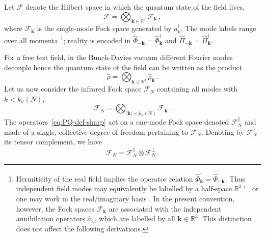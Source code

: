 \documentclass{article}
\numberwithin{equation}{section}
\begin{document}
		Let $\mathcal{F}$ denote the Hilbert space in which the quantum state of the field lives,
		\begin{equation}
			\mathcal{F}=\bigotimes_{\bm{k}\in \mathbb{R}^{3}}  \mathcal{F}_{\bm{k}}\, ,
		\end{equation}
		where $\mathcal{F}_{\bm{k}}$ is the single-mode Fock space generated by $\hat{a}_k^{\dagger}$. The mode labels range over all momenta
        \footnote{Hermiticity of the real field implies the operator relation $\hat\Phi_{\mathbf{k}}^{\dagger}=\hat\Phi_{-\mathbf{k}}$. Thus independent field modes may equivalently be labelled by a half-space $\mathbb{R}^{3+}$, or one may work in the real/imaginary basis \cite{Lesgourgues:1996jc,Kiefer:1998jk,Martin:2018zbe}. In the present convention, however, the Fock spaces $\mathcal F_{\mathbf k}$ are associated with the independent annihilation operators $\hat a_{\mathbf k}$, which are labelled by all $\mathbf k\in\mathbb R^3$. This distinction does not affect the following derivations.}; reality is encoded in $\hat{\Phi}_{-\bm{k}}=\hat{\Phi}_{\bm{k}}^\dagger$ and $\hat{\Pi}_{-\bm{k}}=\hat{\Pi}_{\bm{k}}^\dagger$.

        For a free test field, in the Bunch-Davies vacuum different Fourier modes decouple hence the quantum state of the field can be written as the product
		\begin{equation}
			\hat{\rho} = \bigotimes _{\bm{k}\in \mathbb{R}^{3}} \hat{\rho}_{\bm{k}}\, .
		\end{equation}
		Let us now consider the infrared Fock space \(\mathcal{F}_N\) containing all modes with \(k < k_\sigma(N)\),
		\begin{equation}
			\label{eq:FN:def}
			\mathcal{F}_N = \bigotimes_{|\bm{k}| < k_\sigma(N)} \mathcal{F}_{\bm{k}}\, .
		\end{equation}
		The operators~\eqref{eq:PQ-def-sharp} act on a one-mode Fock space denoted $\mathcal{F}_N^\parallel$ and made of a single, collective degree of freedom pertaining to $\mathcal{F}_N$. Denoting by $\mathcal{F}_N^\perp$ its tensor complement, we have
		\begin{equation}
			\mathcal{F}_N = \mathcal{F}_N^\parallel \otimes \mathcal{F}_N^\perp\, .
		\end{equation}
\end{document}
